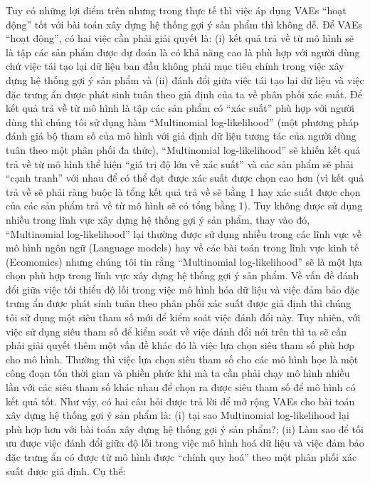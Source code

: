 Tuy có những lợi điểm trên nhưng trong thực tế thì việc áp dụng VAEs ``hoạt động'' tốt với bài toán xây dựng hệ thống gợi ý sản phẩm thì không dễ.
Để VAEs ``hoạt động'', có hai việc cần phải giải quyết là: (i) kết quả trả về từ mô hình sẽ là tập các sản phẩm được dự đoán là có khả năng cao là phù hợp với người dùng chứ việc tái tạo lại dữ liệu ban đầu không phải mục tiêu chính trong việc xây dựng hệ thống gợi ý sản phẩm và (ii) đánh đổi giữa việc tái tạo lại dữ liệu và việc đặc trưng ẩn được phát sinh tuân theo giả định của ta về phân phối xác suất.
Để kết quả trả về từ mô hình là tập các sản phẩm có ``xác suất'' phù hợp với người dùng thì chúng tôi sử dụng hàm 
``Multinomial log-likelihood'' (một phương pháp đánh giá bộ tham số của mô hình với giả định dữ liệu tương tác của người dùng tuân theo một phân phối đa thức),
``Multinomial log-likelihood'' sẽ khiến kết quả trả về từ mô hình thể hiện ``giá trị độ lớn về xác suất'' và các sản phẩm sẽ phải ``cạnh tranh'' với nhau để có thể đạt được xác suất được chọn cao hơn (vì kết quả trả về sẽ phải ràng buộc là tổng kết quả trả về sẽ bằng 1 hay xác suất được chọn của các sản phẩm trả về từ mô hình sẽ có tổng bằng 1).
Tuy không được sử dụng nhiều trong lĩnh vực xây dựng hệ thống gợi ý sản phẩm, thay vào đó, ``Multinomial log-likelihood'' lại thường được sử dụng nhiều trong các lĩnh vực về mô hình ngôn ngữ (Language models) hay về các bài toán trong lĩnh vực kinh tế (Ecomomics) nhưng chúng tôi tin rằng ``Multinomial log-likelihood'' sẽ là một lựa chọn phù hợp trong lĩnh vực xây dựng hệ thống gợi ý sản phẩm.
Về vấn đề đánh đổi giữa việc tối thiểu độ lỗi trong việc mô hình hóa dữ liệu và việc đảm bảo đặc trưng ẩn được phát sinh tuân theo phân phối xác suất được giả định thì chúng tôi sử dụng một siêu tham số mới để kiểm soát việc đánh đổi này.
Tuy nhiên, với việc sử dụng siêu tham số để kiểm soát về việc đánh đổi nói trên thì ta sẽ cần phải giải quyết thêm một vấn đề khác đó là việc lựa chọn siêu tham số phù hợp cho mô hình.
Thường thì việc lựa chọn siêu tham số cho các mô hình học là một công đoạn tốn thời gian và phiền phức khi mà ta cần phải chạy mô hình nhiều lần với các siêu tham số khác nhau để chọn ra được siêu tham số để mô hình có kết quả tốt.
Như vậy, có hai câu hỏi được trả lời để mở rộng VAEs cho bài toán xây dựng hệ thống gợi ý sản phẩm là: (i) tại sao Multinomial log-likelihood lại phù hợp hơn với bài toán xây dựng hệ thống gợi ý sản phẩm?; (ii) Làm sao để tối ưu được việc đánh đổi giữa độ lỗi trong việc mô hình hoá dữ liệu và việc đảm bảo đặc trưng ẩn có được từ mô hình được ``chính quy hoá'' theo một phân phối xác suất được giả định. Cụ thể:
